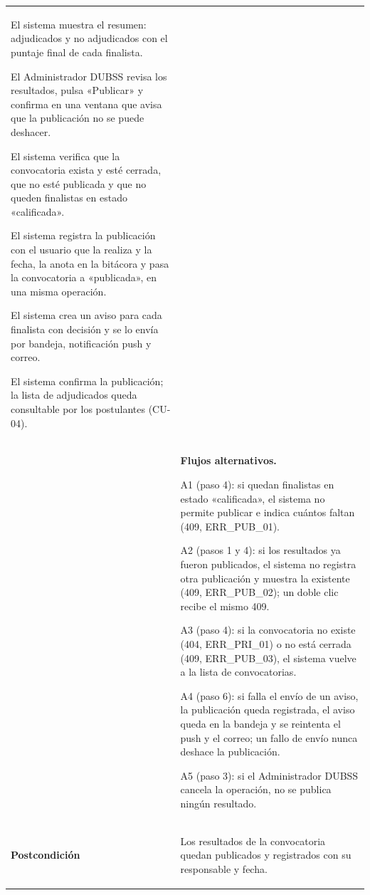 \begin{longtable}{>{\raggedright\arraybackslash}p{2.9cm} >{\raggedright\arraybackslash}p{12.6cm}}
\begin{cupasos}
    \item El sistema muestra el resumen: adjudicados y no adjudicados con el puntaje final de cada finalista.
    \item El Administrador DUBSS revisa los resultados, pulsa «Publicar» y confirma en una ventana que avisa que la publicación no se puede deshacer.
    \item El sistema verifica que la convocatoria exista y esté cerrada, que no esté publicada y que no queden finalistas en estado «calificada».
    \item El sistema registra la publicación con el usuario que la realiza y la fecha, la anota en la bitácora y pasa la convocatoria a «publicada», en una misma operación.
    \item El sistema crea un aviso para cada finalista con decisión y se lo envía por bandeja, notificación push y correo.
    \item El sistema confirma la publicación; la lista de adjudicados queda consultable por los postulantes (CU-04).
\end{cupasos} \\
 & \textbf{Flujos alternativos.}
\begin{cuvin}
    \item A1 (paso 4): si quedan finalistas en estado «calificada», el sistema no permite publicar e indica cuántos faltan (409, ERR\_PUB\_01).
    \item A2 (pasos 1 y 4): si los resultados ya fueron publicados, el sistema no registra otra publicación y muestra la existente (409, ERR\_PUB\_02); un doble clic recibe el mismo 409.
    \item A3 (paso 4): si la convocatoria no existe (404, ERR\_PRI\_01) o no está cerrada (409, ERR\_PUB\_03), el sistema vuelve a la lista de convocatorias.
    \item A4 (paso 6): si falla el envío de un aviso, la publicación queda registrada, el aviso queda en la bandeja y se reintenta el push y el correo; un fallo de envío nunca deshace la publicación.
    \item A5 (paso 3): si el Administrador DUBSS cancela la operación, no se publica ningún resultado.
\end{cuvin} \\
\midrule
\textbf{Postcondición} & \vspace{-\baselineskip}\begin{cuvin}
    \item Los resultados de la convocatoria quedan publicados y registrados con su responsable y fecha.

\end{cuvin}
\end{longtable}
